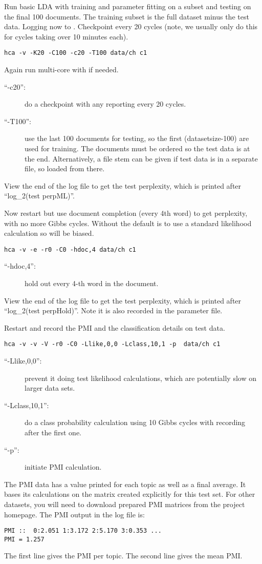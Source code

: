 \documentclass[a4paper,english]{article}
\begin{document}
Run basic LDA with training and parameter fitting on a subset
and testing on the final 100 documents.  
The training subset is the full dataset minus the test data.
Logging now to .
Checkpoint every 20 cycles
(note, we usually only do this for cycles taking over 10 minutes each).
\begin{verbatim}
hca -v -K20 -C100 -c20 -T100 data/ch c1
\end{verbatim}
Again run multi-core with  if needed.
\begin{description}
\item[``-c20'':] do a checkpoint with any reporting every
20 cycles.
\item[``-T100'':] use the last 100 documents for testing,
so the first (datasetsize-100) are used for training.
The documents must be ordered so the test data is at the end.
Alternatively, a file stem can be given if test data is in a 
separate file, so loaded from there.
\end{description}
View the end of the log file to get the test perplexity,
which is printed after ``log\_2(test perpML)''.

Now restart but use document completion (every 4th word) to 
get perplexity, with no more Gibbs cycles.
Without  the default is to use
a standard likelihood calculation so will be biased.
\begin{verbatim}
hca -v -e -r0 -C0 -hdoc,4 data/ch c1
\end{verbatim}
\begin{description}
\item[``-hdoc,4'':] hold out every 4-th word in
the document.
\end{description}
View the end of the log file to get the test perplexity,
which is printed after ``log\_2(test perpHold)''.
Note it is also recorded in the parameter file.

Restart and record the 
PMI and the classification details on test data.
\begin{verbatim}
hca -v -v -V -r0 -C0 -Llike,0,0 -Lclass,10,1 -p  data/ch c1
\end{verbatim}
\begin{description}
\item[``-Llike,0,0'':] prevent it 
doing test likelihood calculations, which are potentially slow
on larger data sets.
\item[``-Lclass,10,1'':] do a class probability calculation
using 10 Gibbs cycles with recording after the first one.
\item[``-p'':] initiate PMI calculation.
\end{description}
The PMI data has a value printed for each topic as well as a 
final average.  It bases its calculations on the matrix
 created explicitly for this test set.
For other datasets, you will need to download prepared
PMI matrices from the project homepage.
The PMI output in the log file is:
\begin{verbatim}
PMI ::  0:2.051 1:3.172 2:5.170 3:0.353 ...
PMI = 1.257
\end{verbatim}
The first line gives the PMI per topic.
The second line gives the mean PMI.
\end{document}

